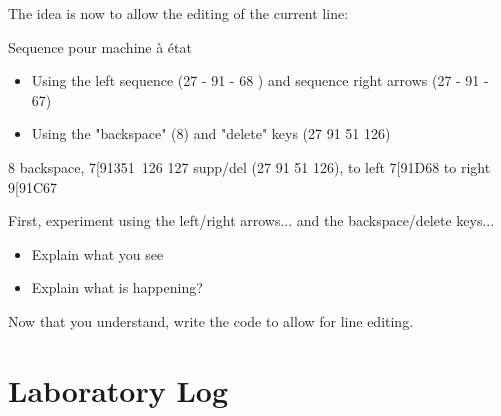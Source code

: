 \documentclass[10]{article}
\begin{document}
The idea is now to allow the editing of the current line:

Sequence pour machine à état 
\begin{itemize}
\item Using the left sequence (27 - 91 - 68 ) and sequence right arrows (27 - 91 - 67)
\item Using the "backspace" (8) and "delete" keys  (27 91  51 126)
\end{itemize}

8 backspace, 7[91351~126 127 supp/del (27 91  51 126), to left 7[91D68 to right 9[91C67

First, experiment using the left/right arrows...
and the backspace/delete keys... 

\begin{itemize}
\item Explain what you see
\item Explain what is happening?
\end{itemize}

Now that you understand, write the code to allow for line editing.

\section{Laboratory Log}
\end{document}
